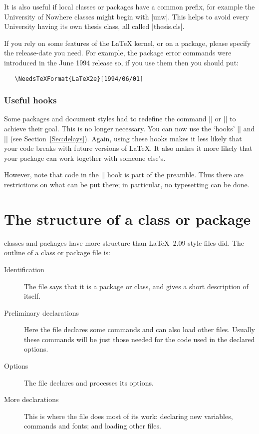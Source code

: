 \documentclass[11pt]{ltxguide}[1995/11/28]
\begin{document}
It is also useful if local classes or packages have a common prefix,
for example the University of Nowhere classes might begin with |unw|.
This helps to avoid every University having its own thesis class, all
called |thesis.cls|.

If you rely on some features of the \LaTeX{} kernel, or on a package,
please specify the release-date you need.  For example, the package
error commands were introduced in the June 1994 release so, if you use
them then you should put:
\begin{verbatim}
   \NeedsTeXFormat{LaTeX2e}[1994/06/01]
\end{verbatim}

\subsubsection{Useful hooks}

Some packages and document styles had to redefine the command
|\document| or |\enddocument| to achieve their goal.  This is no
longer necessary. You can now use the `hooks' |\AtBeginDocument| and
|\AtEndDocument| (see Section~\ref{Sec:delays}).  Again, using these
hooks makes it less likely that your code breaks with future versions
of \LaTeX{}. It also makes it more likely that your package can work
together with someone else's.

However, note that code in the |\AtBeginDocument| hook is part of the
preamble.  Thus there are restrictions on what can be put there; in
particular, no typesetting can be done.

\section{The structure of a class or package}
\label{Sec:structure}

\LaTeXe{} classes and packages have more structure than \LaTeX~2.09
style files did.  The outline of a class or package file is:
\begin{description}
\item[Identification] The file says that it is a \LaTeXe{} package or
   class, and gives a short description of itself.
\item[Preliminary declarations]
   Here the file declares some commands and can also load
   other files.  Usually these commands will be just those needed for
   the code used in the declared options.
\item[Options] The file declares and processes its options.
\item[More declarations] This is where the file does most of its work:
   declaring new variables, commands and fonts; and loading other files.
\end{description}
\end{document}
